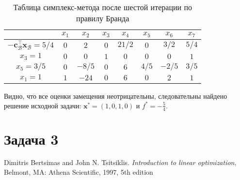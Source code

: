 \documentclass[12pt]{article}
\newcommand{\bx}{\mathbf{x}}
\begin{document}
\begin{table}[!ht]
\centering
\caption{Таблица симплекс-метода после шестой итерации по правилу Бранда}
\begin{tabular}{|c|ccccccc|}
\hline
& $x_1$ & $x_2$ & $x_3$ & $x_4$ & $x_5$ & $x_6$ & $x_7$\\
\hline
$-\mathbf{c}_{\mathcal{B}}^{\top}\bx_{\mathcal{B}} = 5/4$ & $0$ & $2$ & $0$ & $21/2$ & $0$ & $3/2$ & $5/4$ \\
\hline
$x_3 = 1$ & $0$ & $0$ & $1$ & $0$ & $0$ & $0$ & $1$ \\
$x_5 = 3/5$ & $0$ & $-8/5$ & $0$ & $6$ & $4/5$ & $-2/5$ & $3/5$ \\
$x_1 = 1$ & $1$ & $-24$ & $0$ & $6$ & $0$ & $2$ & $1$ \\
\hline
\end{tabular}
\label{tab::simplex_26_2}
\end{table}

Видно, что все оценки замещения неотрицательны, следовательны найдено решение исходной задачи: $\bx^* = (1, 0, 1, 0)$ и $f^* = -\frac{5}{4}$.


\section{Задача 3}

\begin{thebibliography}{9}

Dimitris Bertsimas and John N. Tsitsiklis. \emph{Introduction to linear optimization}, Belmont, MA: Athena Scientific, 1997, 5th edition

\end{thebibliography}
\end{document}
